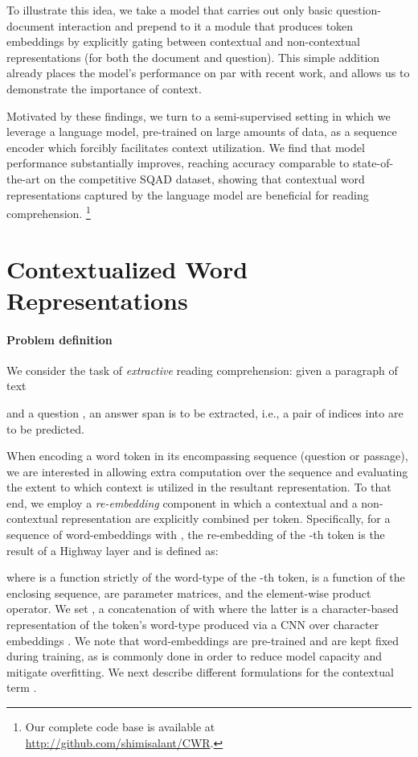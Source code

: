 \documentclass[11pt,a4paper]{article}
\newcommand{\squad}{\textsc{SQ\normalfont{u}AD}}
\newcommand{\cnn}{\textsc{CNN}}
\begin{document}
To illustrate this idea, we take a model that carries out only basic question-document interaction and prepend to it a module that produces token embeddings by explicitly gating between contextual and non-contextual representations (for both the document and question). This simple addition already places the model's performance on par with recent work, and allows us to demonstrate the importance of context.

Motivated by these findings, we turn to a semi-supervised setting in which we leverage a language model, pre-trained on large amounts of data, as a sequence encoder which forcibly facilitates context utilization. We find that model performance substantially improves, reaching accuracy comparable to state-of-the-art on the competitive \squad{} dataset, showing that contextual word representations captured by the language model are beneficial for reading comprehension.
\footnote{Our complete code base is available at {\small{\url{http://github.com/shimisalant/CWR}}}.}
 
\section{Contextualized Word Representations}
\label{sec:model}

\paragraph{Problem definition} We consider the task of \textit{extractive} reading comprehension: given a paragraph of text

and a question
, an answer span  is to be extracted, i.e., a pair of indices  into  are to be predicted.

When encoding a word token in its encompassing sequence (question or passage), we are interested in allowing extra computation over the sequence and evaluating the extent to which context is utilized in the resultant representation.
To that end, we employ a \textit{re-embedding} component in which a contextual and a non-contextual representation are explicitly combined per token. Specifically, for a sequence of word-embeddings  with , the re-embedding of the -th token  is the result of a Highway layer \cite{srivastava2015} and is defined as:

where  is a function strictly of the word-type of the -th token,  is a function of the enclosing sequence,  are parameter matrices, and  the element-wise product operator. We set , a concatenation of  with  where the latter is a character-based representation of the token's word-type produced via a \cnn{} over character embeddings \cite{kim2014}. We note that word-embeddings  are pre-trained \citep{pennington2014} and are kept fixed during training, as is commonly done in order to reduce model capacity and mitigate overfitting. We next describe different formulations for the contextual term .
\end{document}
